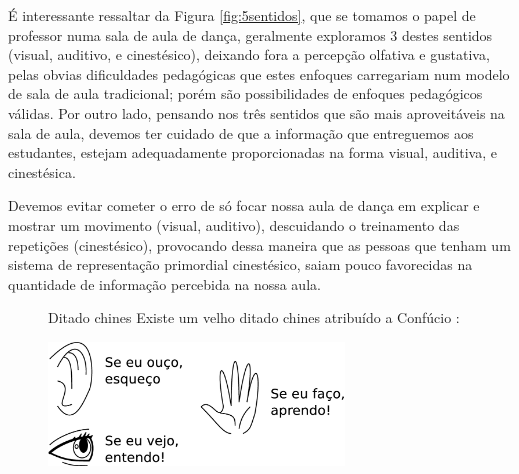 É interessante ressaltar da Figura \ref{fig:5sentidos}, 
que se tomamos o papel de professor  numa sala de aula de dança, 
geralmente exploramos 3 destes sentidos
(visual, auditivo, e cinestésico), 
deixando fora a percepção olfativa e gustativa, 
pelas obvias dificuldades pedagógicas que estes enfoques carregariam num modelo de sala de aula tradicional;
porém são possibilidades de enfoques pedagógicos válidas.
Por outro lado, pensando nos três sentidos que são mais aproveitáveis na sala de aula,
devemos ter cuidado de que a informação que entreguemos aos estudantes, 
estejam adequadamente proporcionadas na forma visual, auditiva, e cinestésica.
\begin{tcbattention}
Devemos evitar cometer o erro de só focar nossa aula de dança em explicar e mostrar um movimento (visual, auditivo),
descuidando o treinamento das repetições (cinestésico), 
provocando dessa maneira que as pessoas que tenham um sistema de representação primordial cinestésico, 
saiam pouco favorecidas na quantidade de informação percebida na nossa aula.
\end{tcbattention}


\begin{figure}[!ht]
\begin{elaboracion}{Ditado chines}
Existe um velho ditado chines atribuído a Confúcio \cite[pp. 60, 63]{AprendendoInteligencia2008} \cite[pp. 9]{abe2002introducao}:

\begin{center}
    \includegraphics[width=0.7\textwidth]{chapters/cap-learning/ditadochines.eps}
\end{center}
\end{elaboracion}
\end{figure}

